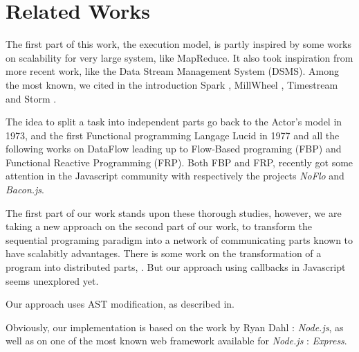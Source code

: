 \section{Related Works} \label{section:related}


The first part of this work, the execution model, is partly inspired by some works on scalability for very large system, like MapReduce\cite{Dean2008}.
It also took inspiration from more recent work, like the Data Stream Management System (DSMS).
Among the most known, we cited in the introduction Spark \cite{Zaharia2010}, MillWheel \cite{Akidau2013}, Timestream \cite{Qian2013} and Storm \cite{Marz2011}.

The idea to split a task into independent parts go back to the Actor's model\cite{Hewitt1973} in 1973, and the first Functional programming Langage Lucid\cite{Ashcroft1977} in 1977 and all the following works on DataFlow leading up to Flow-Based programing (FBP)\cite{Morrison1994a} and Functional Reactive Programming (FRP)\cite{Elliott1997}.
Both FBP and FRP, recently got some attention in the Javascript community with respectively the projects \textit{NoFlo}\cite{NoFlo} and \textit{Bacon.js}\cite{Paananen2012}.

The first part of our work stands upon these thorough studies, however, we are taking a new approach on the second part of our work, to transform the sequential programing paradigm into a network of communicating parts known to have scalabitly advantages.
There is some work on the transformation of a program into distributed parts\cite{Amini2012}, \cite{Petit2009}.
But our approach using callbacks in Javascript seems unexplored yet.

Our approach uses AST modification, as described in\cite{Jones2003}.

Obviously, our implementation is based on the work by Ryan Dahl : \textit{Node.js}\cite{Dahl}, as well as on one of the most known web framework available for \textit{Node.js} : \textit{Express}\cite{express}.